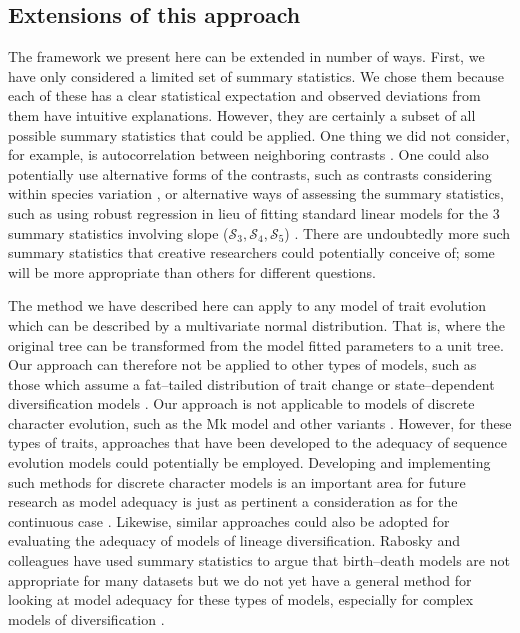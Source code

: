 \documentclass[a4paper,12pt]{article}
\begin{document}
\subsection*{Extensions of this approach}
The framework we present here can be extended in number of ways. First, we have only considered a limited set of summary statistics. We chose them because each of these has a clear statistical expectation and observed deviations from them have intuitive explanations. However, they are certainly a subset of all possible summary statistics that could be applied. One thing we did not consider, for example, is autocorrelation between neighboring contrasts \citep[see][]{Gittleman1990}. One could also potentially use alternative forms of the contrasts, such as contrasts considering within species variation \citep{Felsenstein2008}, or alternative ways of assessing the summary statistics, such as using robust regression in lieu of fitting standard linear models for the 3 summary statistics involving slope ($\mathcal{S}_3, \mathcal{S}_4, \mathcal{S}_5$) \citep{SlaterPennell}. There are undoubtedly more such summary statistics that creative researchers could potentially conceive of; some will be more appropriate than others for different questions.

The method we have described here can apply to any model of trait evolution which can be described by a multivariate normal distribution. That is, where the original tree can be transformed from the model fitted parameters to a unit tree. Our approach can therefore not be applied to other types of models, such as those which assume a fat--tailed distribution of trait change \citep[e.g.][]{Landis2012} or state--dependent diversification models \citep[e.g.][]{Bokma2008, FitzJohn2010}. Our approach is not applicable to models of discrete character evolution, such as the Mk model \citep{Pagel1994} and other variants \citep[e.g.][]{Felsenstein2012, Beaulieu2013}. However, for these types of traits, approaches that have been developed to the adequacy of sequence evolution models \citep[e.g.][]{Bollback2002, Lewis2013} could potentially be employed. Developing and implementing such methods for discrete character models is an important area for future research as model adequacy is just as pertinent a consideration as for the continuous case \citep{ReadNee1995}. Likewise, similar approaches could also be adopted for evaluating the adequacy of models of lineage diversification. Rabosky and colleagues \citep[e.g.][]{Rabosky2009AmNat, Rabosky2012} have used summary statistics to argue that birth--death models \citep{Nee1992, Alfaro2009} are not appropriate for many datasets but we do not yet have a general method for looking at model adequacy for these types of models, especially for complex models of diversification \citep[e.g.][]{Stadler2011, Etienne2012PRSB}.
\end{document}
